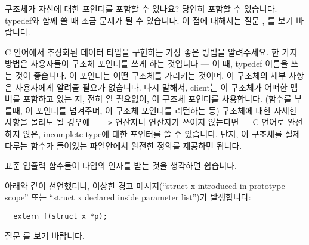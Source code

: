 \begin{faq}
	구조체가 자신에 대한 포인터를 포함할 수 있나요?
\A
	당연히 포함할 수 있습니다. typedef와 함께 쓸 때 조금 문제가 될 수 있습니다.
        이 점에 대해서는 질문 , 를 보기 바랍니다.
\end{faq}

\begin{faq}
	C 언어에서 추상화된 데이터 타입을 구현하는 가장 좋은 방법을
	알려주세요.
\A
	한 가지 방법은 사용자들이 구조체 포인터를 쓰게 하는 것입니다 ---
	이 때, typedef 이름을 쓰는 것이 좋습니다.  이 포인터는 어떤 구조체를
	가리키는 것이며, 이 구조체의 세부 사항은 사용자에게 알려줄 필요가
	없습니다.
        다시 말해서, client는 이 구조체가 어떠한 멤버를 포함하고 있는 지, 전혀
        알 필요없이, 이 구조체 포인터를 사용합니다. (함수를 부를때,
        이 포인터를 넘겨주며, 이 구조체 포인터를 리턴하는 등)
        구조체에 대한 자세한 사항을 몰라도 될 경우에 --- \verb+->+ 연산자나
         연산자가 쓰이지 않는다면 --- C 언어로 완전하지 않은,
        incomplete type에 대한 포인터를 쓸 수 있습니다. 단지, 이 구조체를
        실제 다루는 함수가 들어있는 파일안에서 완전한 정의를 제공하면 됩니다.

\T
	표준 입출력 함수들이  타입의 인자를
	받는 것을 생각하면 쉽습니다.
\end{faq}

\begin{faq}
        아래와 같이 선언했더니, 이상한 경고 메시지(``struct x introduced in
        prototype scope'' 또는 ``struct x declared inside parameter list'')가
        발생합니다:
\begin{verbatim}
  extern f(struct x *p);
\end{verbatim}
\A
        질문 를 보기 바랍니다.
\end{faq}

